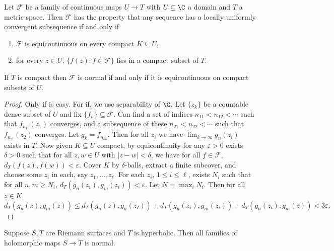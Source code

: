 \documentclass[a4paper]{article}
\begin{document}
\begin{theorem}
  Let \(\mathcal F\) be a family of continuous maps \(U \to T\) with \(U \subseteq \C\) a domain and \(T\) a metric space. Then \(\mathcal F\) has the property that any sequence has a locally uniformly convergent subsequence if and only if
  \begin{enumerate}
  \item \(\mathcal F\) is equicontinuous on every compact \(K \subseteq U\),
  \item for every \(z \in U\), \(\{f(z): f \in \mathcal F\}\) lies in a compact subset of \(T\).
  \end{enumerate}
\end{theorem}

\begin{corollary}
  If \(T\) is compact then \(\mathcal F\) is normal if and only if it is equicontinuous on compact subsets of \(U\).
\end{corollary}

\begin{proof}
  Only if is easy. For if, we use separability of \(\C\). Let \(\{z_k\}\) be a countable dense subset of \(U\) and fix \(\{f_n\} \subseteq \mathcal F\). Can find a set of indices \(n_{11} < n_{12} < \cdots\) such that \(f_{n_{1i}}(z_1)\) converges, and a subsequence of these \(n_{21} < n_{22} < \cdots\) such that \(f_{n_{2i}}(z_2)\) converges. Let \(g_k = f_{n_{kk}}\). Then for all \(z_i\) we have \(\lim_{k \to \infty} g_n(z_i)\) exists in \(T\). Now given \(K \subseteq U\) compact, by equicontinuity for any \(\varepsilon > 0\) exists \(\delta > 0\) such that for all \(z, w \in U\) with \(|z - w| < \delta\), we have for all \(f \in \mathcal F\), \(d_T(f(z), f(w)) < \varepsilon\). Cover \(K\) by \(\delta\)-balls, extract a finite subcover, and choose some \(z_i\) in each, say \(z_1, \dots, z_\ell\). For each \(z_i\), \(1 \leq i \leq \ell\), exists \(N_i\) such that for all \(n, m \geq N_i\), \(d_T(g_n(z_i), g_m(z_i)) < \varepsilon\). Let \(N = \max_i N_i\). Then for all \(z \in K\),
  \[
    d_T(g_n(z), g_m(z)) \leq d_T(g_n(z), g_n(z_I)) + d_T(g_n(z_i), g_m(z_i)) + d_T(g_n(z_i), g_m(z)) < 3\varepsilon.
  \]
\end{proof}

\begin{theorem}[Montel]
  Suppose \(S, T\) are Riemann surfaces and \(T\) is hyperbolic. Then all families of holomorphic maps \(S \to T\) is normal.
\end{theorem}
\end{document}
